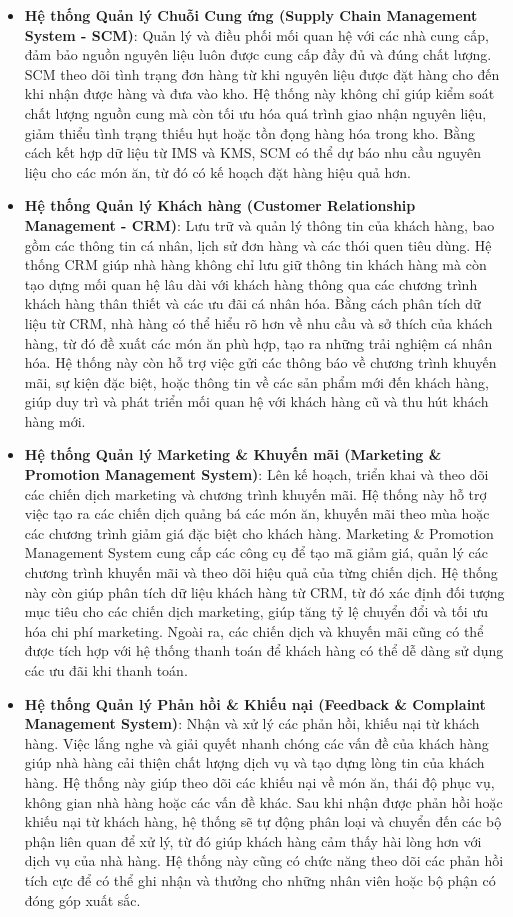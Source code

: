 \begin{itemize}
    \item \textbf{Hệ thống Quản lý Chuỗi Cung ứng (Supply Chain Management System - SCM)}: Quản lý và điều phối mối quan hệ với các nhà cung cấp, đảm bảo nguồn nguyên liệu luôn được cung cấp đầy đủ và đúng chất lượng. SCM theo dõi tình trạng đơn hàng từ khi nguyên liệu được đặt hàng cho đến khi nhận được hàng và đưa vào kho. Hệ thống này không chỉ giúp kiểm soát chất lượng nguồn cung mà còn tối ưu hóa quá trình giao nhận nguyên liệu, giảm thiểu tình trạng thiếu hụt hoặc tồn đọng hàng hóa trong kho. Bằng cách kết hợp dữ liệu từ IMS và KMS, SCM có thể dự báo nhu cầu nguyên liệu cho các món ăn, từ đó có kế hoạch đặt hàng hiệu quả hơn.
    
    \item \textbf{Hệ thống Quản lý Khách hàng (Customer Relationship Management - CRM)}: Lưu trữ và quản lý thông tin của khách hàng, bao gồm các thông tin cá nhân, lịch sử đơn hàng và các thói quen tiêu dùng. Hệ thống CRM giúp nhà hàng không chỉ lưu giữ thông tin khách hàng mà còn tạo dựng mối quan hệ lâu dài với khách hàng thông qua các chương trình khách hàng thân thiết và các ưu đãi cá nhân hóa. Bằng cách phân tích dữ liệu từ CRM, nhà hàng có thể hiểu rõ hơn về nhu cầu và sở thích của khách hàng, từ đó đề xuất các món ăn phù hợp, tạo ra những trải nghiệm cá nhân hóa. Hệ thống này còn hỗ trợ việc gửi các thông báo về chương trình khuyến mãi, sự kiện đặc biệt, hoặc thông tin về các sản phẩm mới đến khách hàng, giúp duy trì và phát triển mối quan hệ với khách hàng cũ và thu hút khách hàng mới.

    \item \textbf{Hệ thống Quản lý Marketing \& Khuyến mãi (Marketing \& Promotion Management System)}: Lên kế hoạch, triển khai và theo dõi các chiến dịch marketing và chương trình khuyến mãi. Hệ thống này hỗ trợ việc tạo ra các chiến dịch quảng bá các món ăn, khuyến mãi theo mùa hoặc các chương trình giảm giá đặc biệt cho khách hàng. Marketing \& Promotion Management System cung cấp các công cụ để tạo mã giảm giá, quản lý các chương trình khuyến mãi và theo dõi hiệu quả của từng chiến dịch. Hệ thống này còn giúp phân tích dữ liệu khách hàng từ CRM, từ đó xác định đối tượng mục tiêu cho các chiến dịch marketing, giúp tăng tỷ lệ chuyển đổi và tối ưu hóa chi phí marketing. Ngoài ra, các chiến dịch và khuyến mãi cũng có thể được tích hợp với hệ thống thanh toán để khách hàng có thể dễ dàng sử dụng các ưu đãi khi thanh toán.

    \item \textbf{Hệ thống Quản lý Phản hồi \& Khiếu nại (Feedback \& Complaint Management System)}: Nhận và xử lý các phản hồi, khiếu nại từ khách hàng. Việc lắng nghe và giải quyết nhanh chóng các vấn đề của khách hàng giúp nhà hàng cải thiện chất lượng dịch vụ và tạo dựng lòng tin của khách hàng. Hệ thống này giúp theo dõi các khiếu nại về món ăn, thái độ phục vụ, không gian nhà hàng hoặc các vấn đề khác. Sau khi nhận được phản hồi hoặc khiếu nại từ khách hàng, hệ thống sẽ tự động phân loại và chuyển đến các bộ phận liên quan để xử lý, từ đó giúp khách hàng cảm thấy hài lòng hơn với dịch vụ của nhà hàng. Hệ thống này cũng có chức năng theo dõi các phản hồi tích cực để có thể ghi nhận và thưởng cho những nhân viên hoặc bộ phận có đóng góp xuất sắc.


\end{itemize}
